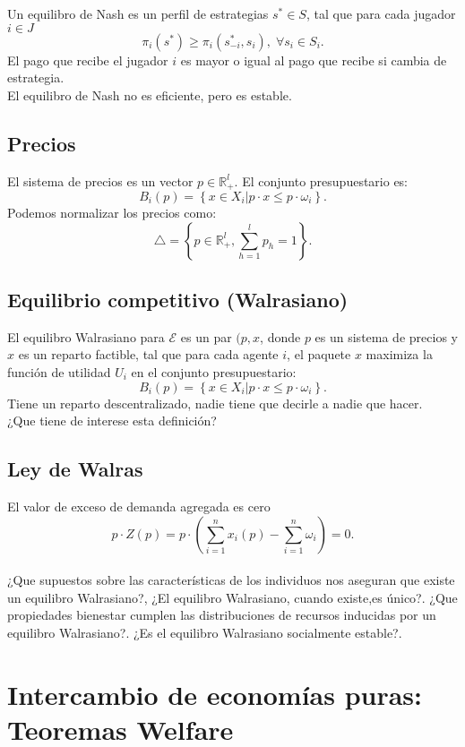 Un equilibro de Nash es un perfil de estrategias $s^*\in S$, tal que para cada jugador $i\in J$ 
$$\pi_i(s^*)\geq \pi_i(s_{-i}^*,s_i),\; \forall s_i\in S_i.$$
El pago que recibe el jugador $i$ es mayor o igual al pago que recibe si cambia de estrategia.\\

El equilibro de Nash no es eficiente, pero es estable.


\section{Precios}
El sistema de precios es un vector $p\in\mathbb{R}^l_+$. El conjunto presupuestario es:
$$B_i(p)=\left\{x\in X_i| p\cdot x\leq p\cdot \omega_i\right\}.$$
Podemos normalizar los precios como:
$$\triangle = \left\{p\in\mathbb{R}^l_+, \sum_{h=1}^l p_h=1\right\}.$$


\section{Equilibrio competitivo (Walrasiano)}
El equilibro Walrasiano para $\mathcal{E}$ es un par $(p,x$, donde $p$ es un sistema de precios y $x$ es un reparto factible, tal que para cada agente $i$, el paquete $x$ maximiza la función de utilidad $U_i$ en el conjunto presupuestario:
$$B_i(p)=\left\{x\in X_i| p\cdot x\leq p\cdot \omega_i\right\}.$$
Tiene un reparto descentralizado, nadie tiene que decirle a nadie que hacer.\\
¿Que tiene de interese esta definición?

\section{Ley de Walras}
El valor de exceso de demanda agregada es cero
$$p\cdot Z(p)=p\cdot \left(\sum_{i=1}^n x_i(p)-\sum_{i=1}^n \omega_i\right)=0.$$\\

¿Que supuestos sobre las características de los individuos nos aseguran que existe un equilibro Walrasiano?, ¿El equilibro Walrasiano, cuando existe,es único?. ¿Que propiedades bienestar cumplen las distribuciones de recursos inducidas por un equilibro Walrasiano?. ¿Es el equilibro Walrasiano socialmente estable?.

\chapter{Intercambio de economías puras: Teoremas Welfare}

